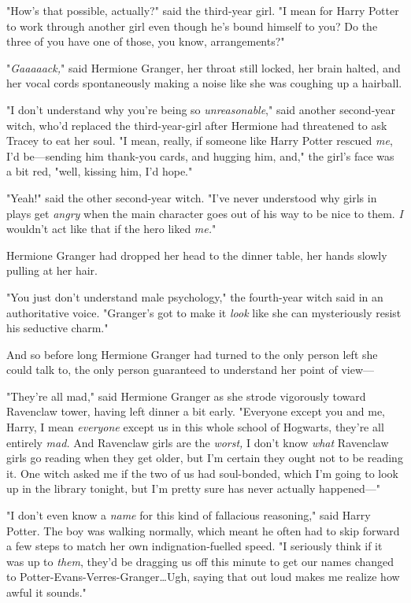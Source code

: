 "How's that possible, actually?" said the third-year girl. "I mean for Harry
Potter to work through another girl even though he's bound himself to you? Do
the three of you have one of those, you know, arrangements?"

"\emph{Gaaaaack,}" said Hermione Granger, her throat still locked, her brain
halted, and her vocal cords spontaneously making a noise like she was coughing
up a hairball.

"I don't understand why you're being so \emph{unreasonable}," said another
second-year witch, who'd replaced the third-year-girl after Hermione had
threatened to ask Tracey to eat her soul. "I mean, really, if someone like
Harry Potter rescued \emph{me}, I'd be—sending him thank-you cards, and
hugging him, and," the girl's face was a bit red, "well, kissing him, I'd hope."

"Yeah!" said the other second-year witch. "I've never understood why girls in
plays get \emph{angry} when the main character goes out of his way to be nice
to them. \emph{I} wouldn't act like that if the hero liked \emph{me.}"

Hermione Granger had dropped her head to the dinner table, her hands slowly
pulling at her hair.

"You just don't understand male psychology," the fourth-year witch said in an
authoritative voice. "Granger's got to make it \emph{look} like she can
mysteriously resist his seductive charm."

And so before long Hermione Granger had turned to the only person left she
could talk to, the only person guaranteed to understand her point of view—

"They're all mad," said Hermione Granger as she strode vigorously toward
Ravenclaw tower, having left dinner a bit early. "Everyone except you and me,
Harry, I mean \emph{everyone} except us in this whole school of Hogwarts,
they're all entirely \emph{mad.} And Ravenclaw girls are the \emph{worst,} I
don't know \emph{what} Ravenclaw girls go reading when they get older, but I'm
certain they ought not to be reading it. One witch asked me if the two of us
had soul-bonded, which I'm going to look up in the library tonight, but I'm
pretty sure has never actually happened—"

"I don't even know a \emph{name} for this kind of fallacious reasoning," said
Harry Potter. The boy was walking normally, which meant he often had to skip
forward a few steps to match her own indignation-fuelled speed. "I seriously
think if it was up to \emph{them}, they'd be dragging us off this minute to get
our names changed to Potter-Evans-Verres-Granger…Ugh, saying that out
loud makes me realize how awful it sounds."

